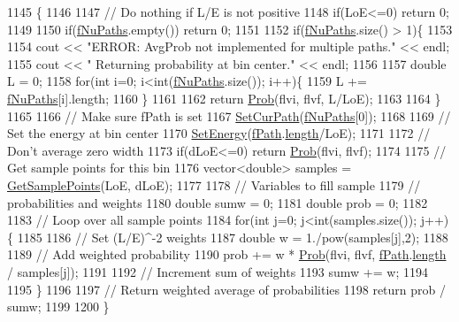 \begin{DoxyCode}
1145 \{
1146 
1147   \textcolor{comment}{// Do nothing if L/E is not positive}
1148   \textcolor{keywordflow}{if}(LoE<=0) \textcolor{keywordflow}{return} 0;
1149 
1150   \textcolor{keywordflow}{if}(\hyperlink{classOscProb_1_1PMNS__Base_a69db9d57e12fc7cbe0431bc6c18fac93}{fNuPaths}.empty()) \textcolor{keywordflow}{return} 0;
1151 
1152   \textcolor{keywordflow}{if}(\hyperlink{classOscProb_1_1PMNS__Base_a69db9d57e12fc7cbe0431bc6c18fac93}{fNuPaths}.size() > 1)\{
1153 
1154     cout << \textcolor{stringliteral}{"ERROR: AvgProb not implemented for multiple paths."} << endl;
1155     cout << \textcolor{stringliteral}{"       Returning probability at bin center."} << endl;
1156 
1157     \textcolor{keywordtype}{double} L = 0;
1158     \textcolor{keywordflow}{for}(\textcolor{keywordtype}{int} i=0; i<int(\hyperlink{classOscProb_1_1PMNS__Base_a69db9d57e12fc7cbe0431bc6c18fac93}{fNuPaths}.size()); i++)\{
1159       L += \hyperlink{classOscProb_1_1PMNS__Base_a69db9d57e12fc7cbe0431bc6c18fac93}{fNuPaths}[i].length;
1160     \}
1161 
1162     \textcolor{keywordflow}{return} \hyperlink{classOscProb_1_1PMNS__Base_aec5c399b93261f1962a4b7dbbb44b973}{Prob}(flvi, flvf, L/LoE);
1163 
1164   \}
1165 
1166   \textcolor{comment}{// Make sure fPath is set}
1167   \hyperlink{classOscProb_1_1PMNS__Base_a986e6ebef09a7e2eb7fee16a4c2c834d}{SetCurPath}(\hyperlink{classOscProb_1_1PMNS__Base_a69db9d57e12fc7cbe0431bc6c18fac93}{fNuPaths}[0]);
1168 
1169   \textcolor{comment}{// Set the energy at bin center}
1170   \hyperlink{classOscProb_1_1PMNS__Base_a95b3b0d0cab5e6a54b5ef99587f837c0}{SetEnergy}(\hyperlink{classOscProb_1_1PMNS__Base_a849437aa8891fe042e86886ce8f81c6e}{fPath}.\hyperlink{structOscProb_1_1NuPath_af22660894b6e25cf835500381b155557}{length}/LoE);
1171 
1172   \textcolor{comment}{// Don't average zero width}
1173   \textcolor{keywordflow}{if}(dLoE<=0) \textcolor{keywordflow}{return} \hyperlink{classOscProb_1_1PMNS__Base_aec5c399b93261f1962a4b7dbbb44b973}{Prob}(flvi, flvf);
1174 
1175   \textcolor{comment}{// Get sample points for this bin}
1176   vector<double> samples = \hyperlink{classOscProb_1_1PMNS__Base_a9eac8d768c1424755ee41f7e783af179}{GetSamplePoints}(LoE, dLoE);
1177 
1178   \textcolor{comment}{// Variables to fill sample}
1179   \textcolor{comment}{// probabilities and weights}
1180   \textcolor{keywordtype}{double} sumw = 0;
1181   \textcolor{keywordtype}{double} prob = 0;
1182 
1183   \textcolor{comment}{// Loop over all sample points}
1184   \textcolor{keywordflow}{for}(\textcolor{keywordtype}{int} j=0; j<int(samples.size()); j++)\{
1185 
1186     \textcolor{comment}{// Set (L/E)^-2 weights}
1187     \textcolor{keywordtype}{double} w = 1./pow(samples[j],2);
1188 
1189     \textcolor{comment}{// Add weighted probability}
1190     prob += w * \hyperlink{classOscProb_1_1PMNS__Base_aec5c399b93261f1962a4b7dbbb44b973}{Prob}(flvi, flvf, \hyperlink{classOscProb_1_1PMNS__Base_a849437aa8891fe042e86886ce8f81c6e}{fPath}.\hyperlink{structOscProb_1_1NuPath_af22660894b6e25cf835500381b155557}{length} / samples[j]);
1191 
1192     \textcolor{comment}{// Increment sum of weights}
1193     sumw += w;
1194 
1195   \}
1196 
1197   \textcolor{comment}{// Return weighted average of probabilities}
1198   \textcolor{keywordflow}{return} prob / sumw;
1199 
1200 \}
\end{DoxyCode}
